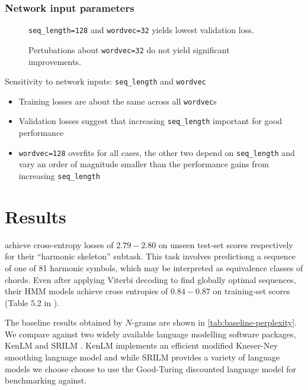 \subsubsection{Network input parameters}


\begin{figure}[tb]
    \centering
    
    \caption{\texttt{seq\_length=128} and \texttt{wordvec=32} yields lowest validation loss.}
    \label{fig:torch-rnn-input-params}
\end{figure}

\begin{figure}[tb]
  \centering
  
  \caption{Pertubations about \texttt{wordvec=32} do not yield significant improvements.}
  \label{fig:torch-rnn-input-params-wordvec}
\end{figure}

Sensitivity to network inputs: \texttt{seq\_length} and \texttt{wordvec}
\begin{itemize}
    \item Training losses are about the same across all \texttt{wordvec}s
    \item Validation losses suggest that increasing \texttt{seq\_length} important for good performance 
    \item \texttt{wordvec=128} overfits for all cases, the other two depend on \texttt{seq\_length} and vary an order of magnitude smaller than the performance gains from increasing \texttt{seq\_length}
\end{itemize}

\section{Results}

\citet{Allan2005} achieve cross-entropy losses of $2.79-2.80$ on unseen
test-set scores respectively for their ``harmonic skeleton'' subtask. This task
involves predictiong a sequence of one of 81 harmonic symbols, which may be
interpreted as equivalence classes of chords. Even after applying Viterbi
decoding to find globally optimal sequences, their HMM models achieve cross
entropies of $0.84-0.87$ on training-set scores (Table 5.2 in
\citet{Allan2005}).

The baseline results obtained by $N$-grams are shown in
\vref{tab:baseline-perplexity}. We compare against two widely available
language modelling software packages, KenLM \citep{Heafield-estimate} and
SRILM \citep{stolcke2002srilm}. KenLM implements an efficient modified
Kneser-Ney smoothing language model and while SRILM provides a variety of
language models we choose choose to use the Good-Turing discounted language
model for benchmarking against.

